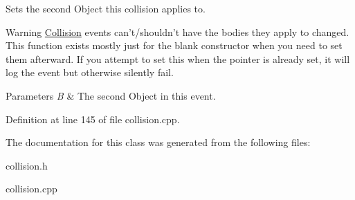Sets the second Object this collision applies to. 

\begin{DoxyWarning}{Warning}
\hyperlink{classMezzanine_1_1Collision}{Collision} events can't/shouldn't have the bodies they apply to changed. This function exists mostly just for the blank constructor when you need to set them afterward. If you attempt to set this when the pointer is already set, it will log the event but otherwise silently fail. 
\end{DoxyWarning}

\begin{DoxyParams}{Parameters}
{\em B} & The second Object in this event. \\
\hline
\end{DoxyParams}


Definition at line 145 of file collision.cpp.



The documentation for this class was generated from the following files:\begin{DoxyCompactItemize}
\item 
collision.h\item 
collision.cpp\end{DoxyCompactItemize}
